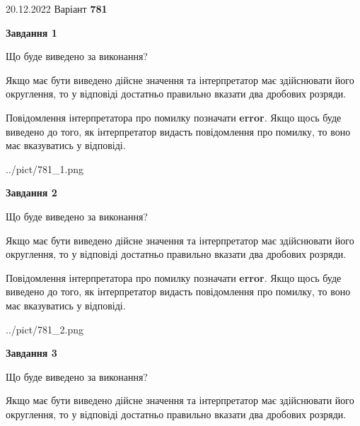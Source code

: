 \documentclass[12pt, ukrainian]{article}
\begin{document}
{20.12.2022 Варіант \No \textbf { 781 }\par}
{
\begin {Large}

{\begin {center}\textbf{Завдання 1}\end {center}}\par
Що буде виведено за виконання? \par

Якщо має бути виведено дійсне значення та інтерпретатор має здійснювати його округлення, 
то у відповіді достатньо правильно вказати два дробових розряди.

Повідомлення інтерпретатора про помилку позначати \textbf{error}.
Якщо щось буде виведено до того, як інтерпретатор видасть повідомлення про помилку, 
то воно має вказуватись у відповіді. \par

\begin{center}
	{../pict/781_1.png}
\end{center}
\newpage

{\begin {center}\textbf{Завдання 2}\end {center}}\par
Що буде виведено за виконання? \par

Якщо має бути виведено дійсне значення та інтерпретатор має здійснювати його округлення, 
то у відповіді достатньо правильно вказати два дробових розряди.

Повідомлення інтерпретатора про помилку позначати \textbf{error}.
Якщо щось буде виведено до того, як інтерпретатор видасть повідомлення про помилку, 
то воно має вказуватись у відповіді. \par

\begin{center}
	{../pict/781_2.png}
\end{center}
\newpage

{\begin {center}\textbf{Завдання 3}\end {center}}\par
Що буде виведено за виконання? \par

Якщо має бути виведено дійсне значення та інтерпретатор має здійснювати його округлення, 
то у відповіді достатньо правильно вказати два дробових розряди.


\end{Large}}
\end{document}
